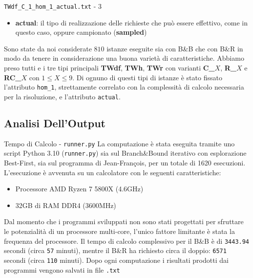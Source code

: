 \documentclass[10pt]{beamer}
\begin{document}
    \begin{frame}{\texttt{TWdf\_C\_1\_hom\_1\_actual.txt} - 3}
        \begin{itemize}
            \item \textbf{actual}: il tipo di realizzazione delle richieste che può essere effettivo, come in questo caso, oppure campionato (\textbf{sampled}) 
        \end{itemize}
        Sono state da noi considerate $810$ istanze eseguite sia con B\&B che con B\&R in modo da tenere in considerazione una buona varietà di caratteristiche. Abbiamo preso tutti e i tre tipi principali \textbf{TWdf}, \textbf{TWh}, \textbf{TWr} con varianti \textbf{C\_}$X$, \textbf{R\_}$X$ e \textbf{RC\_}$X$ con $1 \leq X \leq 9$. Di ognuno di questi tipi di istanze è stato fissato l'attributo \texttt{hom\_1}, strettamente correlato con la complessità di calcolo necessaria per la risoluzione, e l'attributo \texttt{actual}.
    \end{frame}

    \subsection{Analisi Dell'Output}
    \begin{frame}{Tempo di Calcolo - \texttt{runner.py}}
        La computazione è stata eseguita tramite uno script Python 3.10 (\texttt{runner.py}) sia sul Branch\&Bound iterativo con esplorazione Best-First, sia sul programma di Jean-François, per un totale di 1620 esecuzioni. L'esecuzione è avvenuta su un calcolatore con le seguenti caratteristiche:
        \begin{itemize}
            \item Processore AMD Ryzen 7 5800X (4.6GHz)
            \item 32GB di RAM DDR4 (3600MHz)
        \end{itemize}
        Dal momento che i programmi sviluppati non sono stati progettati per sfruttare le potenzialità di un processore multi-core, l'unico fattore limitante è stata la frequenza del processore. Il tempo di calcolo complessivo per il B\&B è di \texttt{3443.94} secondi (circa \texttt{57} minuti), mentre il B\&R ha richiesto circa il doppio: \texttt{6571} secondi (circa \texttt{110} minuti). Dopo ogni computazione i risultati prodotti dai programmi vengono salvati in file \texttt{.txt}
    \end{frame}
\end{document}
